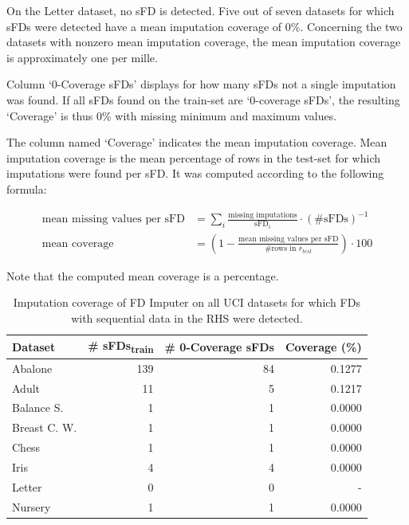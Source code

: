On the Letter dataset, no sFD is detected.
Five out of seven datasets for which sFDs were detected have a mean imputation coverage of 0\%.
Concerning the two datasets with nonzero mean imputation coverage, the mean imputation coverage is approximately one per mille.

Column `0-Coverage sFDs' displays for how many sFDs not a single imputation was found.
If all sFDs found on the train-set are `0-coverage sFDs', the resulting `Coverage' is thus 0\% with missing minimum and maximum values.

The column named `Coverage' indicates the mean imputation coverage.
Mean imputation coverage is the mean percentage of rows in the test-set for which imputations were found per sFD.
It was computed according to the following formula:

\begin{align*}
    \text{mean missing values per sFD} &= \sum_{i} \frac{\text{missing imputations}}{\text{sFD}_i} \cdot \left(\text{\# sFDs}\right)^{-1} \\
    \text{mean coverage} &= \left( 1 - \frac{\text{mean missing values per sFD}}{\text{\# rows in }r_{test}} \right) \cdot 100
\end{align*}

Note that the computed mean coverage is a percentage.

\begin{table}[ht]
    \centering
    \begin{tabular}{lrrr}
        \toprule
        \toprule
        Dataset & \# sFDs\textsubscript{train} & \# 0-Coverage sFDs  & Coverage (\%) \\
        \midrule
        Abalone & 139 & 84 & 0.1277 \\
        Adult & 11 & 5 & 0.1217 \\
        Balance S. & 1 & 1 & 0.0000 \\
        Breast C. W. & 1 & 1 & 0.0000 \\
        Chess & 1 & 1 & 0.0000 \\
        Iris & 4 & 4 & 0.0000 \\
        Letter & 0 & 0 & - \\
        Nursery & 1 & 1 & 0.0000 \\
        \bottomrule
        \bottomrule
    \end{tabular}
    \caption{Imputation coverage of FD Imputer on all UCI datasets for which FDs with sequential data in the RHS were detected.}\label{tab:fd-imputer-mse}
\end{table}

